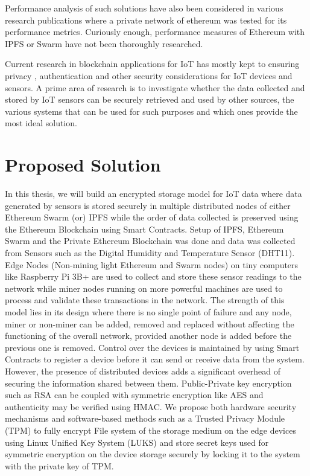 \documentclass[11pt,openright]{report}
\begin{document}
Performance analysis of such solutions have also been considered in various research publications \cite{8342866} where a private network of ethereum was tested for its performance metrics. Curiously enough, performance measures of Ethereum with IPFS or Swarm have not been thoroughly researched. 

Current research in blockchain applications for IoT has mostly kept to ensuring privacy , authentication and other security considerations \cite{8012302} for IoT devices and sensors.
A prime area of research is to investigate whether the data collected and stored by IoT sensors can be securely retrieved and used by other sources, the various systems that can be used for such purposes and which ones provide the most ideal solution.

\section{Proposed Solution}\label{section:proposed_solution}
In this thesis, we will build an encrypted storage model for IoT data where data generated by sensors is stored securely in multiple distributed nodes of either Ethereum Swarm (or) IPFS while the order of data collected is preserved using the Ethereum Blockchain using Smart Contracts. Setup of IPFS, Ethereum Swarm and the Private Ethereum Blockchain was done and data was collected from Sensors such as the Digital Humidity and Temperature Sensor (DHT11). Edge Nodes (Non-mining light Ethereum and Swarm nodes) on tiny computers like Raspberry Pi 3B+ are used to collect and store these sensor readings to the network while miner nodes running on more powerful machines are used to process and validate these transactions in the network. The strength of this model lies in its design where there is no single point of failure and any node, miner or non-miner can be added, removed and replaced without affecting the functioning of the overall  network, provided another node is added before the previous one is removed. Control over the devices is maintained by using Smart Contracts to register a device before it can send or receive data from the system. However, the presence of distributed devices adds a significant overhead of securing the information shared between them. Public-Private key encryption such as RSA can be coupled with symmetric encryption like AES and authenticity may be verified using HMAC. We propose both hardware security mechanisms and software-based methods such as a Trusted Privacy Module (TPM) to fully encrypt File system of the storage medium on the edge devices using Linux Unified Key System (LUKS) and store secret keys used for symmetric encryption on the device storage securely by locking it to the system with the private key of TPM.
\end{document}

